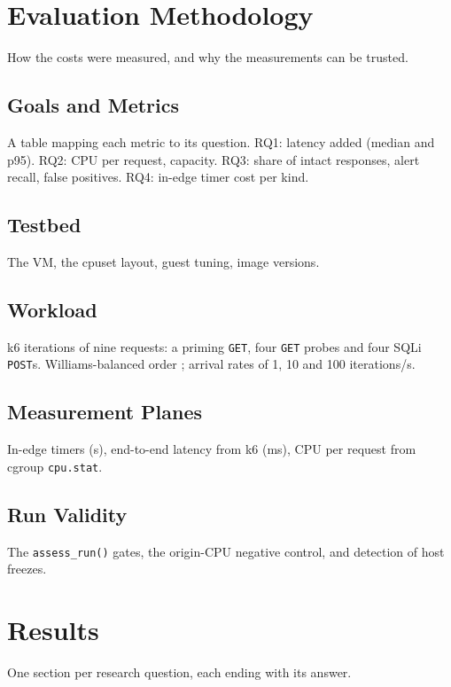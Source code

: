 \documentclass{rptuma}
\begin{document}
\chapter{Evaluation Methodology}
How the costs were measured, and why the measurements can be trusted.

\section{Goals and Metrics}
\label{sec:AB.metrics}
A table mapping each metric to its question. RQ1: latency added (median and p95). RQ2: CPU per
request, capacity. RQ3: share of intact responses, alert recall, false positives. RQ4: in-edge
timer cost per kind.

\section{Testbed}
The VM, the cpuset layout, guest tuning, image versions.

\section{Workload}
k6 iterations of nine requests: a priming \texttt{GET}, four \texttt{GET} probes and four SQLi
\texttt{POST}s. Williams-balanced order \cite{williams1949designs}; arrival rates of 1, 10 and 100
iterations/s.

\section{Measurement Planes}
In-edge timers (\textmu s), end-to-end latency from k6 (ms), CPU per request from cgroup
\texttt{cpu.stat}.

\section{Run Validity}
\label{sec:AB.validity}
The \texttt{assess\_run()} gates, the origin-CPU negative control, and detection of host freezes.

\chapter{Results}
\label{chap:AB.results}
One section per research question, each ending with its answer.
\end{document}
